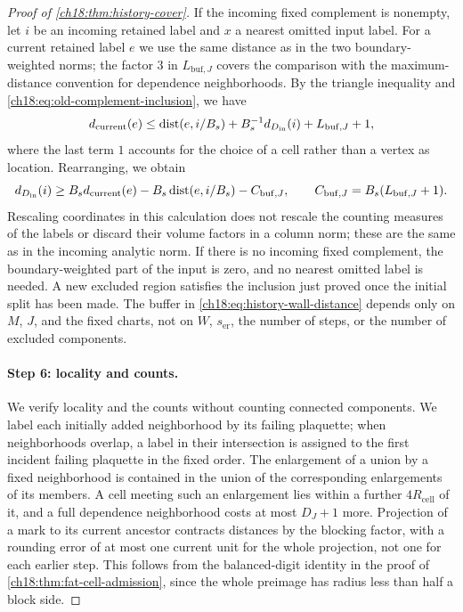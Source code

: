 \begin{proof}[Proof of \cref{ch18:thm:history-cover}]
If the incoming fixed complement is nonempty, let $i$ be an incoming retained label and $x$ a nearest omitted input label. For a current retained label $e$ we use the same distance as in the two boundary-weighted norms; the factor $3$ in $L_{\mathrm{buf},J}$ covers the comparison with the maximum-distance convention for dependence neighborhoods. By the triangle inequality and \eqref{ch18:eq:old-complement-inclusion}, we have
\[
 d_{\mathrm{current}}(e)
 \le \operatorname{dist}(e,i/B_s)+B_s^{-1}d_{D_{\mathrm{in}}}(i)
                                  +L_{\mathrm{buf},J}+1,
\]
where the last term $1$ accounts for the choice of a cell rather than a vertex as location. Rearranging, we obtain
\begin{equation}\label{ch18:eq:history-wall-distance}
 d_{D_{\mathrm{in}}}(i)\ge
 B_s d_{\mathrm{current}}(e)-B_s\operatorname{dist}(e,i/B_s)
                         -C_{\mathrm{buf},J},\qquad
 C_{\mathrm{buf},J}=B_s(L_{\mathrm{buf},J}+1).
\end{equation}
Rescaling coordinates in this calculation does not rescale the counting measures of the labels or discard their volume factors in a column norm; these are the same as in the incoming analytic norm. If there is no incoming fixed complement, the boundary-weighted part of the input is zero, and no nearest omitted label is needed. A new excluded region satisfies the inclusion just proved once the initial split has been made. The buffer in \eqref{ch18:eq:history-wall-distance} depends only on $M$, $J$, and the fixed charts, not on $W$, $s_{\mathrm{er}}$, the number of steps, or the number of excluded components.

\paragraph{Step 6: locality and counts.}
We verify locality and the counts without counting connected components. We label each initially added neighborhood by its failing plaquette; when neighborhoods overlap, a label in their intersection is assigned to the first incident failing plaquette in the fixed order. The enlargement of a union by a fixed neighborhood is contained in the union of the corresponding enlargements of its members. A cell meeting such an enlargement lies within a further $4R_{\mathrm{cell}}$ of it, and a full dependence neighborhood costs at most $D_J+1$ more. Projection of a mark to its current ancestor contracts distances by the blocking factor, with a rounding error of at most one current unit for the whole projection, not one for each earlier step. This follows from the balanced-digit identity in the proof of \cref{ch18:thm:fat-cell-admission}, since the whole preimage has radius less than half a block side.


\end{proof}

